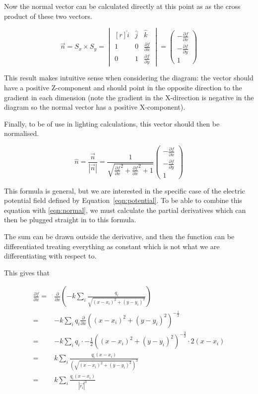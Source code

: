 \documentclass{article} %
\begin{document}
 Now the normal vector can be calculated directly at this point as as the cross product of these two vectors.

$$\vec{n} = S_x \times S_y = \begin{vmatrix*}[r]
\hat{i} & \hat{j} & \hat{k} \\
1 & 0 & \frac{\partial f}{\partial x} \\
0 & 1 & \frac{\partial f}{\partial y}
\end{vmatrix*} =
\begin{pmatrix}-\frac{\partial f}{\partial x} \\ -\frac{\partial f}{\partial y} \\ 1\end{pmatrix}
$$

This result makes intuitive sense when considering the diagram: the vector should have a positive Z-component and should point in the opposite direction to the gradient in each dimension (note the gradient in the X-direction is negative in the diagram so the normal vector has a positive X-component).

Finally, to be of use in lighting calculations, this vector should then be normalised.

\begin{equation}\hat{n} = \frac{\vec{n}}{|\vec{n}|} =
\frac{1}{\sqrt{
    \frac{\partial f}{\partial x}^2 +
    \frac{\partial f}{\partial x}^2 +
    1
}}
\begin{pmatrix}-\frac{\partial f}{\partial x} \\ -\frac{\partial f}{\partial y} \\ 1\end{pmatrix}
\label{eqn:normal}\end{equation}

This formula is general, but we are interested in the specific case of the electric potential field defined by Equation~\ref{eqn:potential}. To be able to combine this equation with \ref{eqn:normal}, we must calculate the partial derivatives which can then be plugged straight in to this formula.

The sum can be drawn outside the derivative, and then the function can be differentiated treating everything as constant which is not what we are differentiating with respect to.

This gives that

\begin{align*}
\frac{\partial f}{\partial x} = &\frac{\partial}{\partial x}(-k\sum_{i}\frac{q_i}{\sqrt{(x-x_i)^2 + (y-y_i)^2}})\\
=&-k\sum_{i}q_i\frac{\partial}{\partial x}((x-x_i)^2 + (y-y_i)^2)^{-\frac{1}{2}} \\
=&-k\sum_{i}q_i \cdot -\frac{1}{2} ((x-x_i)^2 + (y-y_i)^2)^{-\frac{3}{2}} \cdot 2(x-x_i) \\
=&k\sum_{i}\frac{q_i(x-x_i)}{(\sqrt{(x-x_i)^2 + (y-y_i)^2})^3} \\
=&k\sum_{i}\frac{q_i(x-x_i)}{|\vec{r_i}|^3}
\end{align*}
\end{document}
